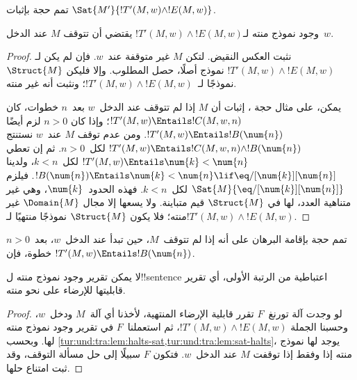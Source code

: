 \documentclass[../../../include/open-logic-section]{subfiles}
\begin{document}
\begin{prob}
  تمم حجة  بإثبات
  $\Sat{M'}{!T'(M,w)\land !E(M,w)}$.
\end{prob}

\begin{lem}
  وجود نموذج منته لـ$!T'(M,w)\land !E(M,w)$ يقتضي أن
  تتوقف $M$ عند الدخل~$w$.
\end{lem}

\begin{proof}
  نثبت العكس النقيض. لتكن $M$ غير متوقفة عند~$w$.
  فإن لم يكن لـ$!T'(M,w)\land !E(M,w)$ نموذج أصلًا،
  حصل المطلوب. وإلا فليكن $\Struct{M}$ نموذجًا
  لـ~$!T'(M,w)\land !E(M,w)$؛ ونثبت أنه غير منته.

  يمكن، على مثال حجة ، إثبات أن
  $M$ إذا لم تتوقف عند الدخل~$w$ بعد~$n$ خطوات، كان
  $!T'(M,w)\Entails !C(M,w,n)$؛ وإذا كان $n>0$ لزم أيضًا
  $!T'(M,w)\Entails !B(\num{n})$.
  ومن عدم توقف $M$ عند~$w$ نستنتج
  $!T'(M,w)\Entails !C(M,w,n)\land !B(\num{n})$
  لكل~$n>0$. ثم إن  تعطي
  $!T'(M,w)\Entails\num{k}<\num{n}$ لكل~$k<n$، ولدينا
  $!B(\num{n})\Entails\num{k}<\num{n}\lif
  \eq/[\num{k}][\num{n}]$. فيلزم
  $\Sat{M}{\eq/[\num{k}][\num{n}]}$ لكل~$k<n$.
  فهذه الحدود~$\num{k}$، وهي غير متناهية العدد، لها في
  $\Struct{M}$ قيم متباينة. ولا يسعها إلا مجال $\Domain{M}$
  غير منته؛ فلا يكون $\Struct{M}$ نموذجًا منتهيًا
  لـ$!T'(M,w)\land !E(M,w)$.
\end{proof}

\begin{prob}
  تمم حجة  بإقامة البرهان على أنه إذا لم
  تتوقف~$M$، حين تبدأ عند الدخل~$w$، بعد~$n>0$ خطوة، فإن
  $!T'(M,w)\Entails !B(\num{n})$.
\end{prob}

\begin{thm}
  لا يمكن تقرير وجود نموذج منته ل!!{sentence} اعتباطية من
  الرتبة الأولى، أي تقرير قابليتها للإرضاء على نحو منته.
\end{thm}

\begin{proof}
  لو وجدت آلة تورنغ~$F$ تقرر قابلية الإرضاء المنتهية،
  لأخذنا أي آلة~$M$ ودخل~$w$، وحسبنا الجملة
  $!T'(M,w)\land !E(M,w)$، ثم استعملنا~$F$ في تقرير
  وجود نموذج منته لها. وبحسب
  \cref{tur:und:tra:lem:halts-sat,tur:und:tra:lem:sat-halts}،
  يوجد لها نموذج منته إذا وفقط إذا توقفت $M$ عند
  الدخل~$w$. فتكون $F$ سبيلًا إلى حل مسألة التوقف،
  وقد ثبت امتناع حلها.
\end{proof}
\end{document}
